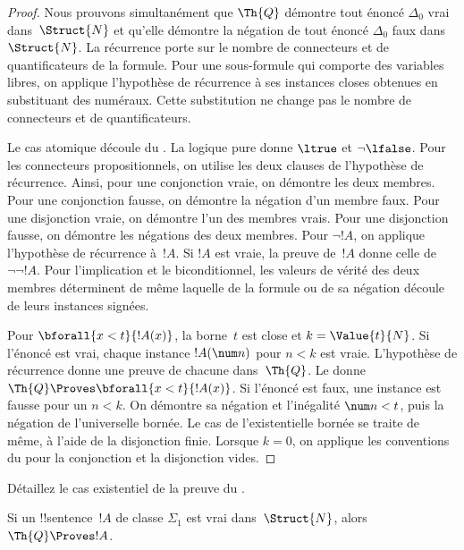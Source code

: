 \documentclass[../../../include/open-logic-section]{subfiles}
\begin{document}
\begin{proof}
Nous prouvons simultanément que $\Th{Q}$ démontre tout énoncé
$\Delta_0$ vrai dans~$\Struct{N}$ et qu'elle démontre la négation
de tout énoncé $\Delta_0$ faux dans~$\Struct{N}$. La récurrence
porte sur le nombre de connecteurs et de quantificateurs de la
formule. Pour une sous-formule qui comporte des variables libres,
on applique l'hypothèse de récurrence à ses instances closes
obtenues en substituant des numéraux. Cette substitution
ne change pas le nombre de connecteurs et de quantificateurs.

Le cas atomique découle du .
La logique pure donne $\ltrue$ et $\lnot\lfalse$.
Pour les connecteurs propositionnels, on utilise les deux clauses
de l'hypothèse de récurrence. Ainsi, pour une conjonction vraie,
on démontre les deux membres. Pour une conjonction fausse, on
démontre la négation d'un membre faux. Pour une disjonction vraie,
on démontre l'un des membres vrais. Pour une disjonction fausse,
on démontre les négations des deux membres. Pour $\lnot !A$,
on applique l'hypothèse de récurrence à~$!A$. Si $!A$ est vraie,
la preuve de~$!A$ donne celle de~$\lnot\lnot !A$.
Pour l'implication et le biconditionnel, les valeurs de vérité
des deux membres déterminent de même laquelle de la formule
ou de sa négation découle de leurs instances signées.

Pour $\bforall{x<t}{!A(x)}$, la borne~$t$ est close et
$k=\Value{t}{N}$. Si l'énoncé est vrai, chaque instance
$!A(\num n)$ pour $n<k$ est vraie. L'hypothèse de récurrence donne
une preuve de chacune dans~$\Th{Q}$. Le
donne $\Th{Q}\Proves\bforall{x<t}{!A(x)}$.
Si l'énoncé est faux, une instance est fausse pour un $n<k$.
On démontre sa négation et l'inégalité $\num n<t$, puis la
négation de l'universelle bornée. Le cas de l'existentielle
bornée se traite de même, à l'aide de la disjonction finie.
Lorsque $k=0$, on applique les conventions du
 pour la conjonction et la
disjonction vides.
\end{proof}

\begin{prob}
Détaillez le cas existentiel de la preuve du
.
\end{prob}

\begin{thm}
Si un !!{sentence}~$!A$ de classe $\Sigma_1$ est vrai
dans~$\Struct{N}$, alors $\Th{Q}\Proves !A$.
\end{thm}
\end{document}
